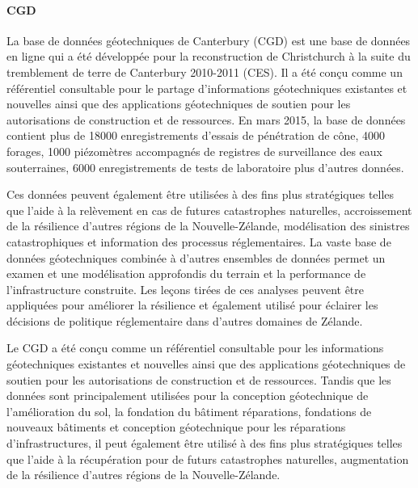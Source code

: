 
\paragraph{CGD}
La base de données géotechniques de Canterbury (CGD) est une base de données en ligne qui a été développée pour
la reconstruction de Christchurch à la suite du tremblement de terre de Canterbury 2010-2011 (CES). Il
a été conçu comme un référentiel consultable pour le partage d'informations géotechniques existantes et nouvelles
ainsi que des applications géotechniques de soutien pour les autorisations de construction et de ressources. En mars
2015, la base de données contient plus de 18000 enregistrements d'essais de pénétration de cône, 4000 forages, 1000
piézomètres accompagnés de registres de surveillance des eaux souterraines, 6000 enregistrements de tests de laboratoire
plus d'autres données. 
\par
Ces données peuvent également être utilisées à des fins plus stratégiques telles que l'aide à la
relèvement en cas de futures catastrophes naturelles, accroissement de la résilience d'autres régions de la Nouvelle-Zélande,
modélisa\-tion des sinistres catastrophiques et information des processus réglementaires. La vaste base de données géotechniques
combinée à d'autres ensembles de données permet un examen et une modélisation approfondis du terrain
et la performance de l'infrastructure construite. Les leçons tirées de ces analyses peuvent être appliquées pour
améliorer la résilience et également utilisé pour éclairer les décisions de politique réglementaire dans d'autres domaines de
Zélande.
\par
Le CGD a été conçu comme un référentiel consultable pour les informations géotechniques existantes et nouvelles
ainsi que des applications géotechniques de soutien pour les autorisations de construction et de ressources. Tandis que
les données sont principalement utilisées pour la conception géotechnique de l'amélioration du sol, la fondation du bâtiment
réparations, fondations de nouveaux bâtiments et conception géotechnique pour les réparations d'infrastructures, il peut
également être utilisé à des fins plus stratégiques telles que l'aide à la récupération pour de futurs
catastrophes naturelles, augmentation de la résilience d'autres régions de la Nouvelle-Zélande.
\cite{scott2015benefits}


